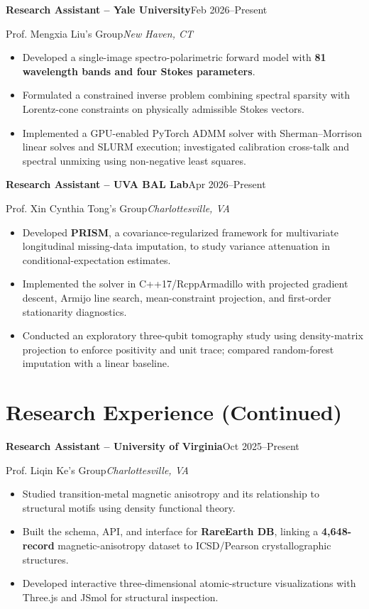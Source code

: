 \documentclass[11pt, letterpaper]{article}
\newenvironment{cvitemize}{
    \begin{itemize}[leftmargin=0.18in, label=\textbullet,
        itemsep=2pt, parsep=0pt, topsep=3pt]
}{\end{itemize}}
\newcommand{\cvheading}[4]{
    \needspace{5\baselineskip}
    \textbf{#1}\hfill #2\par
    \nopagebreak
    #3\hfill\textit{#4}\par
    \nopagebreak
}
\begin{document}
\vspace{5pt}
\cvheading{Research Assistant -- Yale University}{Feb 2026--Present}
    {Prof. Mengxia Liu's Group}{New Haven, CT}
\begin{cvitemize}
    \item Developed a single-image spectro-polarimetric forward model
    with \textbf{81 wavelength bands and four Stokes parameters}.
    \item Formulated a constrained inverse problem combining spectral
    sparsity with Lorentz-cone constraints on physically admissible Stokes vectors.
    \item Implemented a GPU-enabled PyTorch ADMM solver with
    Sherman--Morrison linear solves and SLURM execution; investigated
    calibration cross-talk and spectral unmixing using non-negative least squares.
\end{cvitemize}

\vspace{5pt}
\cvheading{Research Assistant -- UVA BAL Lab}{Apr 2026--Present}
    {Prof. Xin Cynthia Tong's Group}{Charlottesville, VA}
\begin{cvitemize}
    \item Developed \textbf{PRISM}, a covariance-regularized framework
    for multivariate longitudinal missing-data imputation, to study
    variance attenuation in conditional-expectation estimates.
    \item Implemented the solver in C++17/RcppArmadillo with projected
    gradient descent, Armijo line search, mean-constraint projection,
    and first-order stationarity diagnostics.
    \item Conducted an exploratory three-qubit tomography study using
    density-matrix projection to enforce positivity and unit trace;
    compared random-forest imputation with a linear baseline.
\end{cvitemize}

\newpage
\section{Research Experience (Continued)}

\cvheading{Research Assistant -- University of Virginia}{Oct 2025--Present}
    {Prof. Liqin Ke's Group}{Charlottesville, VA}
\begin{cvitemize}
    \item Studied transition-metal magnetic anisotropy and its
    relationship to structural motifs using density functional theory.
    \item Built the schema, API, and interface for \textbf{RareEarth DB},
    linking a \textbf{4,648-record} magnetic-anisotropy dataset
    to ICSD/Pearson crystallographic structures.
    \item Developed interactive three-dimensional atomic-structure
    visualizations with Three.js and JSmol for structural inspection.
\end{cvitemize}
\end{document}
